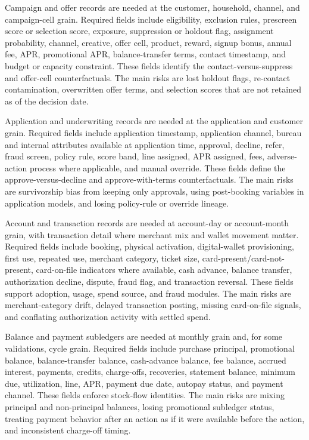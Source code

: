 \documentclass[11pt]{article}
\newcommand{\1}{\mathbf{1}}
\begin{document}
Campaign and offer records are needed at the customer, household, channel, and
campaign-cell grain. Required fields include eligibility, exclusion rules,
prescreen score or selection score, exposure, suppression or holdout flag,
assignment probability, channel, creative, offer cell, product, reward,
signup bonus, annual fee, APR, promotional APR, balance-transfer terms,
contact timestamp, and budget or capacity constraint. These fields identify
the contact-versus-suppress and offer-cell counterfactuals. The main risks are
lost holdout flags, re-contact contamination, overwritten offer terms, and
selection scores that are not retained as of the decision date.

Application and underwriting records are needed at the application and
customer grain. Required fields include application timestamp, application
channel, bureau and internal attributes available at application time,
approval, decline, refer, fraud screen, policy rule, score band, line assigned,
APR assigned, fees, adverse-action process where applicable, and manual
override. These fields define the approve-versus-decline and
approve-with-terms counterfactuals. The main risks are survivorship bias from
keeping only approvals, using post-booking variables in application models,
and losing policy-rule or override lineage.

Account and transaction records are needed at account-day or account-month
grain, with transaction detail where merchant mix and wallet movement matter.
Required fields include booking, physical activation, digital-wallet
provisioning, first use, repeated use, merchant category, ticket size,
card-present/card-not-present, card-on-file indicators where available, cash
advance, balance transfer, authorization decline, dispute, fraud flag, and
transaction reversal. These fields support adoption, usage, spend source, and
fraud modules. The main risks are merchant-category drift, delayed transaction
posting, missing card-on-file signals, and conflating authorization activity
with settled spend.

Balance and payment subledgers are needed at monthly grain and, for some
validations, cycle grain. Required fields include purchase principal,
promotional balance, balance-transfer balance, cash-advance balance, fee
balance, accrued interest, payments, credits, charge-offs, recoveries,
statement balance, minimum due, utilization, line, APR, payment due date,
autopay status, and payment channel. These fields enforce stock-flow
identities. The main risks are mixing principal and non-principal balances,
losing promotional subledger status, treating payment behavior after an action
as if it were available before the action, and inconsistent charge-off timing.
\end{document}
